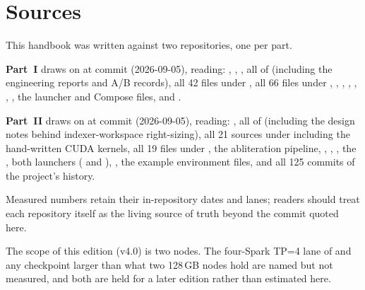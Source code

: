 \section*{Sources}

This handbook was written against two repositories, one per part.

\textbf{Part~I} draws on
 at commit
 (2026-09-05), reading: ,
, , all of 
(including the  engineering reports and A/B records),
all 42 files under , all 66 files under
, , ,
, , ,
, the launcher and Compose files, and
.

\textbf{Part~II} draws on
 at commit
 (2026-09-05), reading: , all of
 (including the design notes behind indexer-workspace
right-sizing), all 21 sources under  including the
hand-written CUDA kernels, all 19 files under , the
 abliteration pipeline, ,
, , the , both
launchers ( and ),
, the example environment files, and all 125 commits
of the project's history.

Measured numbers retain their in-repository dates and lanes; readers should
treat each repository itself as the living source of truth beyond the commit
quoted here.

The scope of this edition (v4.0) is two nodes. The four-Spark TP=4 lane of
 and any checkpoint larger than what two 128\,GB nodes
hold are named but not measured, and both are held for a later edition rather
than estimated here.
